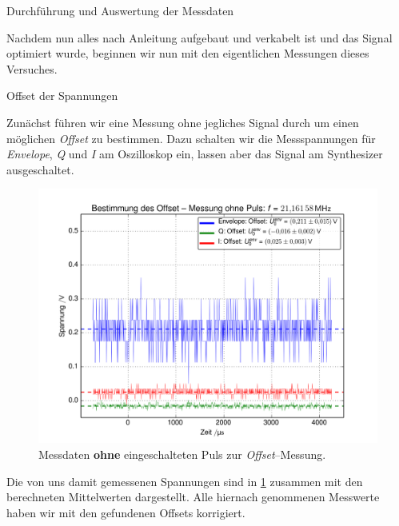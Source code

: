 \documentclass[pdftex, a4paper,11pt, twoside, ngerman]{report}
\begin{document}
  
  
  \begin{chapter}{Durchführung und Auswertung der Messdaten}
    \label{chp:Auswertung}
    
    Nachdem nun alles nach Anleitung aufgebaut und verkabelt ist und das Signal
    optimiert wurde, beginnen wir nun mit den eigentlichen Messungen dieses
    Versuches.
    
    \begin{section}{Offset der Spannungen}
      \label{chpOffset}
      
      Zunächst führen wir eine Messung ohne jegliches Signal durch um einen
      möglichen \textit{Offset} zu bestimmen.
      Dazu schalten wir die Messspannungen für \textit{Envelope}, \textit{Q} und
      \textit{I} am Oszilloskop ein, lassen aber das Signal am Synthesizer
      ausgeschaltet.
      \begin{figure}[hb]
        \centering
        \includegraphics[width=.9\textwidth]{Figures/Offset.png}
        \caption{Messdaten \textbf{ohne} eingeschalteten Puls zur
          \textit{Offset}--Messung.}
        \label{figOffset}
      \end{figure}
      
      Die von uns damit gemessenen Spannungen sind in \cref{figOffset} zusammen
      mit den berechneten Mittelwerten dargestellt.
      Alle hiernach genommenen Messwerte haben wir mit den gefundenen
      Offsets korrigiert.
      
      

\end{section}
\end{chapter}
\end{document}

